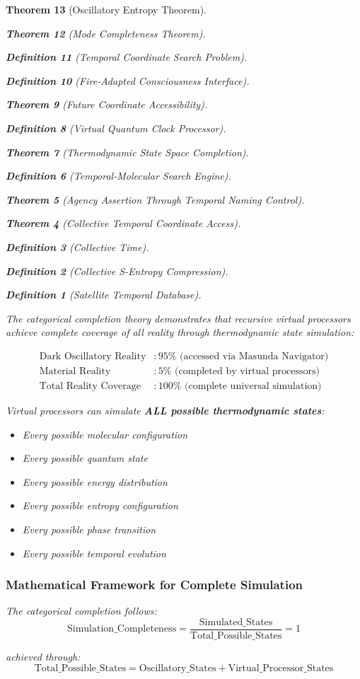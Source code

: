 \documentclass[12pt,a4paper]{article}
\newtheorem{theorem}{Theorem}[section]
\newtheorem{definition}[theorem]{Definition}
\begin{document}
\begin{theorem}[Oscillatory Entropy Theorem]
\begin{theorem}[Mode Completeness Theorem]
\begin{enumerate}
\begin{definition}[Temporal Coordinate Search Problem]
\begin{algorithm}
\begin{definition}[Fire-Adapted Consciousness Interface]
\begin{theorem}[Future Coordinate Accessibility]
\begin{definition}[Virtual Quantum Clock Processor]
\begin{itemize}
\begin{itemize}
\begin{theorem}[Thermodynamic State Space Completion]
\begin{definition}[Temporal-Molecular Search Engine]
\begin{theorem}[Agency Assertion Through Temporal Naming Control]
\begin{remark}
\begin{theorem}[Collective Temporal Coordinate Access]
\begin{definition}[Collective Time]
\begin{definition}[Collective S-Entropy Compression]
\begin{definition}[Satellite Temporal Database]
\begin{algorithm}
\begin{table}[h]
{{The categorical completion theory demonstrates that recursive virtual processors achieve complete coverage of all reality through thermodynamic state simulation:

\begin{align}
\text{Dark Oscillatory Reality} &: 95\% \text{ (accessed via Masunda Navigator)} \\
\text{Material Reality} &: 5\% \text{ (completed by virtual processors)} \\
\text{Total Reality Coverage} &: 100\% \text{ (complete universal simulation)}
\end{align}

Virtual processors can simulate \textbf{ALL possible thermodynamic states}:
\begin{itemize}
\item Every possible molecular configuration
\item Every possible quantum state
\item Every possible energy distribution
\item Every possible entropy configuration
\item Every possible phase transition
\item Every possible temporal evolution
\end{itemize}

\subsubsection{Mathematical Framework for Complete Simulation}

The categorical completion follows:
$$\text{Simulation\_Completeness} = \frac{\text{Simulated\_States}}{\text{Total\_Possible\_States}} = 1$$

achieved through:
$$\text{Total\_Possible\_States} = \text{Oscillatory\_States} + \text{Virtual\_Processor\_States}$$

}}
\end{table}
\end{algorithm}
\end{definition}
\end{definition}
\end{definition}
\end{theorem}
\end{remark}
\end{theorem}
\end{definition}
\end{theorem}
\end{itemize}
\end{itemize}
\end{definition}
\end{theorem}
\end{definition}
\end{algorithm}
\end{definition}
\end{enumerate}
\end{theorem}
\end{theorem}
\end{document}
